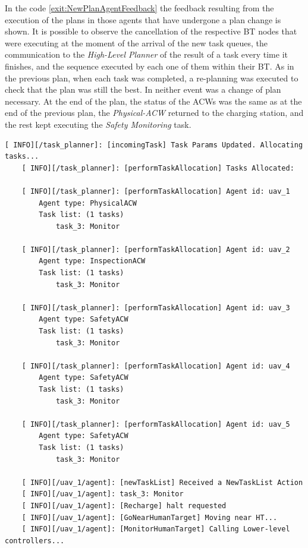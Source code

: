 In the code \ref{exit:NewPlanAgentFeedback} the feedback resulting from the execution of the plans in those agents that have undergone a plan change is shown. It is possible to observe the cancellation of the respective \gls{BT} nodes that were executing at the moment of the arrival of the new task queues, the communication to the \emph{High-Level Planner} of the result of a task every time it finishes, and the sequence executed by each one of them within their \gls{BT}. As in the previous plan, when each task was completed, a re-planning was executed to check that the plan was still the best. In neither event was a change of plan necessary. At the end of the plan, the status of the \glspl{ACW} was the same as at the end of the previous plan, the \emph{Physical-ACW} returned to the charging station, and the rest kept executing the \emph{Safety Monitoring} task.


\begin{lstlisting}[caption={Feedback messages printed after changing the parameters of a task}, breaklines=true, label=exit:paramChange]
    [ INFO][/task_planner]: [incomingTask] Task Params Updated. Allocating tasks...
    [ INFO][/task_planner]: [performTaskAllocation] Tasks Allocated:
    
    [ INFO][/task_planner]: [performTaskAllocation] Agent id: uav_1
        Agent type: PhysicalACW
        Task list: (1 tasks)
            task_3: Monitor
    
    [ INFO][/task_planner]: [performTaskAllocation] Agent id: uav_2
        Agent type: InspectionACW
        Task list: (1 tasks)
            task_3: Monitor
    
    [ INFO][/task_planner]: [performTaskAllocation] Agent id: uav_3
        Agent type: SafetyACW
        Task list: (1 tasks)
            task_3: Monitor
    
    [ INFO][/task_planner]: [performTaskAllocation] Agent id: uav_4
        Agent type: SafetyACW
        Task list: (1 tasks)
            task_3: Monitor
    
    [ INFO][/task_planner]: [performTaskAllocation] Agent id: uav_5
        Agent type: SafetyACW
        Task list: (1 tasks)
            task_3: Monitor
    
    [ INFO][/uav_1/agent]: [newTaskList] Received a NewTaskList Action
    [ INFO][/uav_1/agent]: task_3: Monitor
    [ INFO][/uav_1/agent]: [Recharge] halt requested
    [ INFO][/uav_1/agent]: [GoNearHumanTarget] Moving near HT...
    [ INFO][/uav_1/agent]: [MonitorHumanTarget] Calling Lower-level controllers...
\end{lstlisting}

